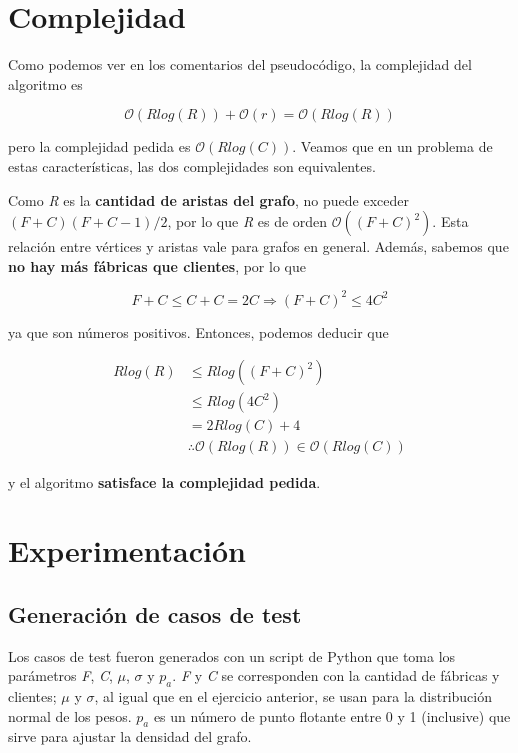 \documentclass[a4paper]{report}
\begin{document}
\section{Complejidad}

Como podemos ver en los comentarios del pseudocódigo, la complejidad del algoritmo es

$$
\mathcal{O}(R log(R)) + \mathcal{O}(r) = \mathcal{O}(R log(R))
$$

pero la complejidad pedida es $\mathcal{O}(R log(C))$. Veamos que en un problema de estas características, las dos complejidades son equivalentes.

Como \textit{R} es la \textbf{cantidad de aristas del grafo}, no puede exceder $(F+C)(F+C-1)/2$, por lo que \textit{R} es de orden $\mathcal{O}((F+C)^2)$. Esta relación entre vértices y aristas vale para grafos en general. Además, sabemos que \textbf{no hay más fábricas que clientes}, por lo que

$$
F + C \leq C + C = 2C \Rightarrow (F + C)^2 \leq 4C^2
$$

ya que son números positivos. Entonces, podemos deducir que

\begin{align*}
	R log(R) & \leq R log((F + C)^2) \\
	& \leq R log(4C^2) \\
	&= 2 R log(C) + 4 \\
	& \therefore \mathcal{O}(R log(R)) \in \mathcal{O}(R log(C))
\end{align*}

y el algoritmo \textbf{satisface la complejidad pedida}.

\section{Experimentación}

\subsection{Generación de casos de test}

Los casos de test fueron generados con un script de Python que toma los parámetros \textit{F}, \textit{C}, $\mu$, $\sigma$ y $p_{a}$. \textit{F} y \textit{C} se corresponden con la cantidad de fábricas y clientes; $\mu$ y $\sigma$, al igual que en el ejercicio anterior, se usan para la distribución normal de los pesos. $p_{a}$ es un número de punto flotante entre 0 y 1 (inclusive) que sirve para ajustar la densidad del grafo.
\end{document}
